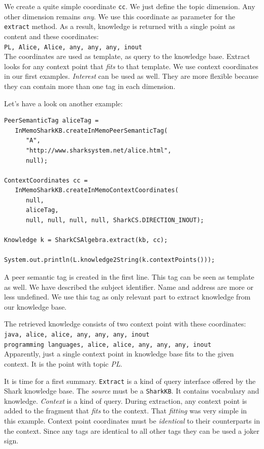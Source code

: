 We create a quite simple coordinate {\tt cc}. We just define the topic dimension. Any other dimension remains {\it any}. We use this coordinate as parameter for the {\tt extract} method. As a result, knowledge is returned with a single point as content and these coordinates:\\

{\tt PL, Alice, Alice, any, any, any, inout}\\

The coordinates are used as template, as query to the knowledge base. Extract looks for any context point that {\it fits} to that template. We use context coordinates in our first examples. {\it Interest} can be used as well. They are more flexible because they can contain more than one tag in each dimension.

Let's have a look on another example:

\begin{verbatim}
PeerSemanticTag aliceTag =
   InMemoSharkKB.createInMemoPeerSemanticTag(
      "A",
      "http://www.sharksystem.net/alice.html",
      null);

ContextCoordinates cc =
   InMemoSharkKB.createInMemoContextCoordinates(
      null,
      aliceTag,
      null, null, null, null, SharkCS.DIRECTION_INOUT);

Knowledge k = SharkCSAlgebra.extract(kb, cc);

System.out.println(L.knowledge2String(k.contextPoints()));

\end{verbatim}

A peer semantic tag is created in the first line. This tag can be seen as
template as well. We have described the subject identifier. Name and address are
more or less undefined. We use this tag as only relevant part to extract knowledge from our knowledge base.

The retrieved knowledge consists of two context point with these coordinates:\\

{\tt java, alice, alice, any, any, any, inout}\\

{\tt programming languages, alice, alice, any, any, any, inout}\\

Apparently, just a single context point in knowledge base fits to the given context. It is the point with topic {\it PL}.

It is time for a first summary. {\tt Extract} is a kind of query interface offered by the Shark knowledge base. The {\it source} must be a {\tt SharkKB}. It contains vocabulary and knowledge. {\it Context} is a kind of query. During extraction, any context point is added to the fragment that {\it fits} to the context. That {\it fitting} was very simple in this example. Context point coordinates must be {\it identical} to their counterparts in the context. Since any tags are identical to all other tags they can be used a joker sign.

